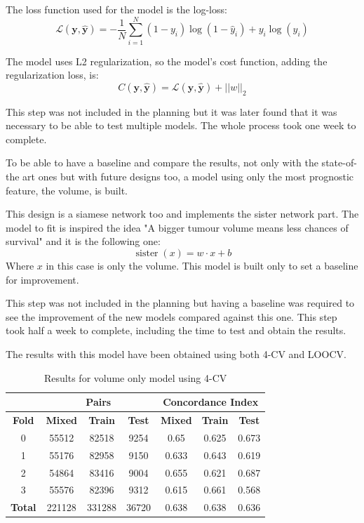 The loss function used for the model is the log-loss:
\[
  \mathcal{L}(\bm{y}, \hat{\bm{y}}) = -\frac{1}{N} \sum_{i = 1}^{N}
  (1 - y_i)\log(1 - \hat{y}_i) + y_i\log(\hat{y}_i)
\]

The model uses L2 regularization, so the model's cost function, 
adding the regularization loss, is:
\[
  C(\bm{y}, \hat{\bm{y}}) = \mathcal{L}(\bm{y}, \hat{\bm{y}}) + 
  ||w||_2
\]

This step was not included in the planning but it was later found that it was necessary to be 
able to test multiple models. The whole process took one week to complete.


To be able to have a baseline and compare the results, not only with the state-of-the art ones
but with future designs too, a model using only the most prognostic feature, the volume, is 
built.

This design is a siamese network too and implements the sister network part. The model to fit
is inspired the idea "A bigger tumour volume means less chances of 
survival" and it is the following one:
\[
  \operatorname{sister}(x) = w\cdot x + b
\]
Where \( x \) in this case is only the volume. This model is built only to set a 
baseline for improvement.

This step was not included in the planning but having a baseline was required to see the 
improvement of the new models compared against this one. This step took half a week to complete,
including the time to test and obtain the results.


The results with this model have been obtained using both 4-CV and \gls{LOOCV}.

\begin{table}
  \centering
  \begin{tabular}{|c||c|c|c||c|c|c|}
    \cline{2-7}
    \multicolumn{1}{c|}{} & \multicolumn{3}{|c||}{\textbf{Pairs}} & 
    \multicolumn{3}{c|}{\textbf{Concordance Index}} \\
    \hline
    \textbf{Fold} & \textbf{Mixed} & \textbf{Train} & \textbf{Test} 
    & \textbf{Mixed} & \textbf{Train} & \textbf{Test} \\
    \hhline{=======}
    0 & 55512 & 82518 & 9254 & 0.65 & 0.625 & 0.673 \\
    1 & 55176 & 82958 & 9150 & 0.633 & 0.643 & 0.619 \\
    2 & 54864 & 83416 & 9004 & 0.655 & 0.621 & 0.687 \\
    3 & 55576 & 82396 & 9312 & 0.615 & 0.661 & 0.568 \\
    \hhline{=======}
    \textbf{Total} & 221128 & 331288 & 36720 & 0.638 & 0.638 & 0.636 \\
    \hline
  \end{tabular}

  \caption{Results for volume only model using 4-CV \label{tab:volume-4CV}}
\end{table}

